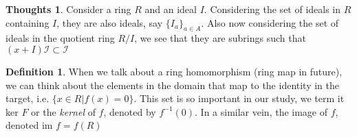 \documentclass[12pt]{book}
\theoremstyle{definition}
\newtheorem*{definition}{Definition}
\newtheorem*{huh}{Thoughts}
\begin{document}
\begin{huh}
    Consider a ring $R$ and an ideal $I$. Considering the set of ideals in $R$ containing $I$, they are also ideals, say $\{I_a\}_{a \in A}$. Also now considering the set of ideals in the quotient ring $R/I$, we see that they are subrings such that $(x + I)\mathcal{I} \subset \mathcal{I}$
\end{huh}
\begin{definition}
    When we talk about a ring homomorphism (ring map in future), we can think about the elements in the domain that map to the identity in the target, i.e. $\{ x \in R| f(x) = 0\}$. This set is so important in our study, we term it ker $F$ or the \textit{kernel} of $f$, denoted by $f^{-1} (0)$. In a similar vein, the image of $f$, denoted im $f = f(R)$
\end{definition}
\end{document}
